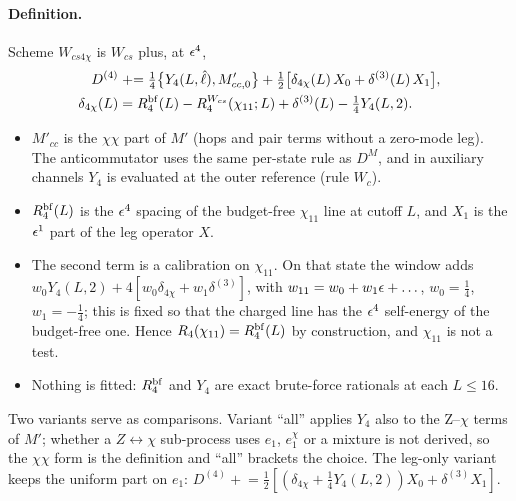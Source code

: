 \paragraph{Definition.} Scheme $W_{cs4\chi}$ is $W_{cs}$ plus, at $\epsilon^4$,
\begin{align}
 D^{(4)}&\mathrel{+}=\tfrac14\big\{Y_4(L,\hat\ell),M'_{cc,0}\big\}+\tfrac12\big[\delta_{4\chi}(L)\,X_0+\delta^{(3)}(L)\,X_1\big],
 \label{htp:d2:eq:wcs4chi}\\
 \delta_{4\chi}(L)&=R^{\rm bf}_4(L)-R_4^{W_{cs}}(\chi_{11};L)+\delta^{(3)}(L)-\tfrac14Y_4(L,2).\nonumber
\end{align}
\begin{itemize}
\item $M'_{cc}$ is the $\chi\chi$ part of $M'$ (hops and pair terms without a zero-mode leg). The anticommutator uses the same
 per-state rule as $D^M$, and in auxiliary channels $Y_4$ is evaluated at the outer reference (rule $W_c$).
\item $R^{\rm bf}_4(L)$ is the $\epsilon^4$ spacing of the budget-free $\chi_{11}$ line at cutoff $L$, and $X_1$ is the $\epsilon^1$
 part of the leg operator $X$.
\item The second term is a calibration on $\chi_{11}$. On that state the window adds $w_0Y_4(L,2)+4[w_0\delta_{4\chi}+w_1
 \delta^{(3)}]$, with $w_{11}=w_0+w_1\epsilon+\dots$, $w_0=\frac14$, $w_1=-\frac14$; this is fixed so that the charged line has the
 $\epsilon^4$ self-energy of the budget-free one. Hence $R_4(\chi_{11})=R^{\rm bf}_4(L)$ by construction, and $\chi_{11}$ is not a
 test.
\item Nothing is fitted: $R^{\rm bf}_4$ and $Y_4$ are exact brute-force rationals at each $L\le16$.
\end{itemize}
Two variants serve as comparisons. Variant ``all'' applies $Y_4$ also to the Z--$\chi$ terms of $M'$; whether a
$Z\leftrightarrow\chi$ sub-process uses $e_1$, $e_1^\chi$ or a mixture is not derived, so the $\chi\chi$ form is the definition
and ``all'' brackets the choice. The leg-only variant keeps the uniform part on $e_1$:
$D^{(4)}\mathrel{+}=\frac12[(\delta_{4\chi}+\frac14Y_4(L,2))X_0+\delta^{(3)}X_1]$.

